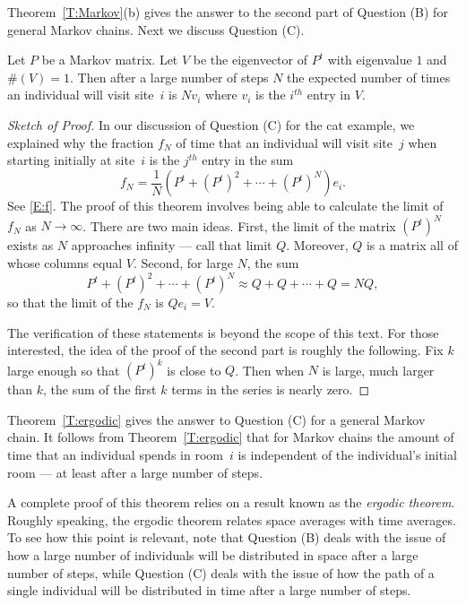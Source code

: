 \documentclass{ximera}
\begin{document}
Theorem~\ref{T:Markov}(b) gives the answer to the second part of Question (B)
for general Markov chains.  Next we discuss Question (C).

\begin{theorem} \label{T:ergodic}
Let $P$ be a Markov matrix.
Let $V$ be the eigenvector of $P^t$ with
eigenvalue $1$ and $\#(V)=1$.  Then after a large number of steps $N$ the
expected number of times an individual will visit site~$i$ is $Nv_i$ where
$v_i$ is the $i^{th}$ entry in $V$.
\end{theorem}

\begin{proof}[Sketch of Proof] In our discussion of Question (C) for the
cat example, we explained why the fraction $f_N$ of time that an individual
will visit site~$j$ when starting initially at site~$i$ is the $j^{th}$ entry
in the sum
\[
f_N = \frac{1}{N}(P^t + (P^t)^2 + \cdots + (P^t)^N)e_i.
\]
See \eqref{E:f}.  The proof of this theorem involves being able to calculate
the limit of $f_N$ as $N\to\infty$.  There are two main ideas.  First, the
limit of the matrix $(P^t)^N$ exists as $N$ approaches infinity --- call that
limit $Q$.  Moreover, $Q$ is a matrix all of whose columns equal $V$.
Second, for large $N$, the sum
\[
P^t + (P^t)^2 + \cdots + (P^t)^N \approx Q + Q + \cdots + Q = NQ,
\]
so that the limit of the $f_N$ is $Qe_i=V$.

The verification of these statements is beyond the scope of this text.
For those interested, the idea of the proof of the second part is roughly the
following.  Fix $k$ large enough so that $(P^t)^k$ is close to $Q$.  Then when
$N$ is large, much larger than $k$, the sum of the first $k$ terms in the
series is nearly zero.  \end{proof}


Theorem~\ref{T:ergodic} gives the answer to Question (C) for a general Markov
chain.  It follows from Theorem~\ref{T:ergodic} that for Markov chains the
amount of time that an individual spends in room~$i$ is independent of the
individual's initial room --- at least after a large number of steps.

A complete proof of this theorem relies on a result known as the {\em ergodic
theorem}.
Roughly speaking, the ergodic theorem relates space averages
with time averages.   To see how this point is relevant, note that Question (B)
deals with the issue of how a large number of individuals will be distributed
in space after a large number of steps, while Question (C) deals with the
issue of how the path of a single individual will be distributed in time after
a large number of steps.
\end{document}

